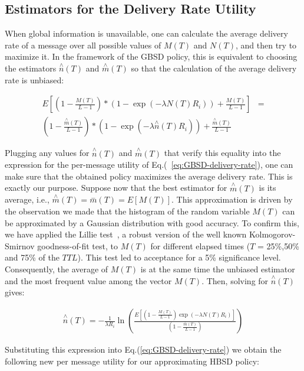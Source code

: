 \subsection{Estimators for the Delivery Rate Utility}
\label{sec:learning:EDR}

When global information is unavailable, one can calculate the average delivery rate of a message over all possible values of
$M(T)$ and $N(T)$, and then try to maximize it. In the framework of the GBSD policy, this is equivalent to choosing the estimators $\stackrel{\wedge}{n}(T)$ and $\stackrel{\wedge}{m}(T)$ so that the calculation of the average delivery rate is unbiased:

\begin{align*}
E[(1 - \frac{M(T)}{L-1})*(1 -\exp(-\lambda N(T) R_i
))+\frac{M(T)}{L-1}]&=
\\(1 -
\frac{\stackrel{\wedge}{m}(T)}{L-1})*(1 -\exp(-\lambda
\stackrel{\wedge}{n}(T) R_i
))+\frac{\stackrel{\wedge}{m}(T)}{L-1}
\end{align*}

Plugging any values for $\stackrel{\wedge}{n}(T)$ and $\stackrel{\wedge}{m}(T)$ that verify this equality into the expression for the per-message utility of Eq.(~\ref{eq:GBSD-delivery-rate}), one can make sure that the obtained policy maximizes the average delivery rate. This is exactly our purpose. Suppose now that the best estimator for $\stackrel{\wedge}{m}(T)$ is its average, i.e., $\stackrel{\wedge}{m}(T)=\stackrel{-}{m}(T)=E[M(T)]$. This approximation is driven by the observation we made that the histogram of the random variable $M(T)$ can be  approximated by a Gaussian distribution with good accuracy. To confirm this, we have applied the Lillie test~\cite{LillieTest}, a robust version of the well known Kolmogorov-Smirnov goodness-of-fit test, to $M(T)$ for different elapsed times ($T$ = 25\%,50\% and 75\% of the $TTL$). This test led to acceptance for a 5\% significance level. Consequently, the average of $M(T)$ is at the same time the unbiased estimator and the most frequent value among the vector $M(T)$. Then, solving for $\stackrel{\wedge}{n}(T)$ gives:

\begin{align}
\stackrel{\wedge}{n}(T) = -\frac{1}{\lambda R_i}
\ln(\frac{E[(1-\frac{M(T)}{L-1})\exp(-\lambda N(T)
R_i)]}{(1-\frac{\stackrel{-}{m}(T)}{L-1})})
\end{align}

Substituting this expression into Eq.(\ref{eq:GBSD-delivery-rate}) we obtain the following new per message utility for our approximating HBSD policy:

